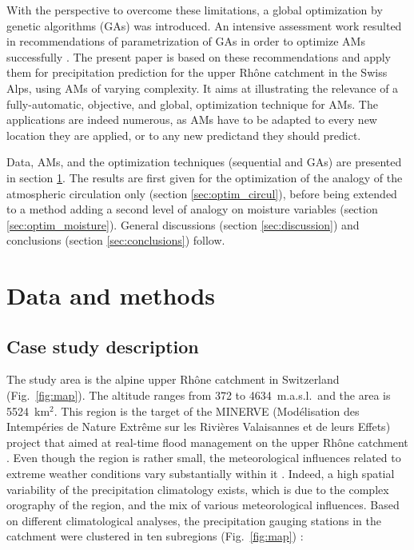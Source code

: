 \documentclass[review]{elsarticle}
\begin{document}
With the perspective to overcome these limitations, a global optimization by genetic algorithms (GAs) was introduced. An intensive assessment work resulted in recommendations of parametrization of GAs in order to optimize AMs successfully \citep{Horton2016}. The present paper is based on these recommendations and apply them for precipitation prediction for the upper Rh\^{o}ne catchment in the Swiss Alps, using AMs of varying complexity. It aims at illustrating the relevance of a fully-automatic, objective, and global, optimization technique for AMs. The applications are indeed numerous, as AMs have to be adapted to every new location they are applied, or to any new predictand they should predict.

Data, AMs, and the optimization techniques (sequential and GAs) are presented in section \ref{sec:data_methods}. The results are first given for the optimization of the analogy of the atmospheric circulation only (section \ref{sec:optim_circul}), before being extended to a method adding a second level of analogy on moisture variables (section \ref{sec:optim_moisture}). General discussions (section \ref{sec:discussion}) and conclusions (section \ref{sec:conclusions}) follow.


\section{Data and methods}
\label{sec:data_methods}


\subsection{Case study description}
\label{sec:case_study}

The study area is the alpine upper Rh\^{o}ne catchment in Switzerland (Fig.\ \ref{fig:map}). The altitude ranges from 372 to 4634~m.a.s.l.\ and the area is 5524~km$^{2}$. This region is the target of the MINERVE (Mod\'{e}lisation des Intemp\'{e}ries de Nature Extr\^{e}me sur les Rivi\`{e}res Valaisannes et de leurs Effets) project that aimed at real-time flood management on the upper Rh\^{o}ne catchment \citep{GarciaHernandez2009b}. Even though the region is rather small, the meteorological influences related to extreme weather conditions vary substantially within it \citep[see][]{Horton2012}. Indeed, a high spatial variability of the precipitation climatology exists, which is due to the complex orography of the region, and the mix of various meteorological influences. Based on different climatological analyses, the precipitation gauging stations in the catchment were clustered in ten subregions (Fig.\ \ref{fig:map}) :
\end{document}
